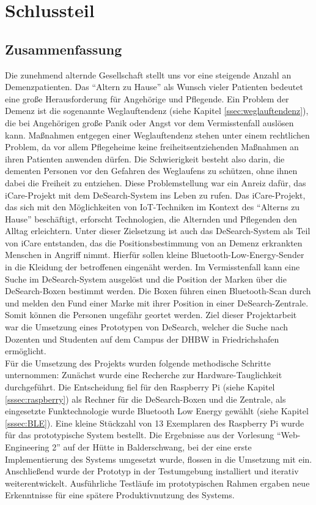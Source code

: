 \section{Schlussteil}
\subsection{Zusammenfassung}
Die zunehmend alternde Gesellschaft stellt uns vor eine steigende Anzahl an Demenzpatienten. Das \enquote{Altern zu Hause} als Wunsch vieler Patienten bedeutet eine große Herausforderung für Angehörige und Pflegende. Ein Problem der Demenz ist die sogenannte Weglauftendenz (siehe Kapitel \ref{ssec:weglauftendenz}), die bei Angehörigen große Panik oder Angst vor dem Vermisstenfall auslösen kann. Maßnahmen entgegen einer Weglauftendenz stehen unter einem rechtlichen Problem, da vor allem Pflegeheime keine freiheitsentziehenden Maßnahmen an ihren Patienten anwenden dürfen. Die Schwierigkeit besteht also darin, die dementen Personen vor den Gefahren des Weglaufens zu schützen, ohne ihnen dabei die Freiheit zu entziehen. Diese Problemstellung war ein Anreiz dafür, das iCare-Projekt mit dem DeSearch-System ins Leben zu rufen. Das iCare-Projekt, das sich mit den Möglichkeiten von IoT-Techniken im Kontext des \enquote{Alterns zu Hause} beschäftigt, erforscht Technologien, die Alternden und Pflegenden den Alltag erleichtern. Unter dieser Zielsetzung ist auch das DeSearch-System als Teil von iCare entstanden, das die Positionsbestimmung von an Demenz erkrankten Menschen in Angriff nimmt.  Hierfür sollen kleine Bluetooth-Low-Energy-Sender in die Kleidung der betroffenen eingenäht werden. Im Vermisstenfall kann eine Suche im DeSearch-System ausgelöst und die Position der Marken über die DeSearch-Boxen bestimmt werden. Die Boxen führen einen Bluetooth-Scan durch und melden den Fund einer Marke mit ihrer Position in einer DeSearch-Zentrale. Somit können die Personen ungefähr geortet werden. Ziel dieser Projektarbeit war die Umsetzung eines Prototypen von DeSearch, welcher die Suche nach Dozenten und Studenten auf dem Campus der DHBW in Friedrichshafen ermöglicht.\\
Für die Umsetzung des Projekts wurden folgende methodische Schritte unternommen: Zunächst wurde eine Recherche zur Hardware-Tauglichkeit durchgeführt. Die Entscheidung fiel für den Raspberry Pi (siehe Kapitel \ref{sssec:raspberry}) als Rechner für die DeSearch-Boxen und die Zentrale, als eingesetzte Funktechnologie wurde Bluetooth Low Energy gewählt (siehe Kapitel \ref{sssec:BLE}). Eine kleine Stückzahl von 13 Exemplaren des Raspberry Pi wurde für das prototypische System bestellt. Die Ergebnisse aus der Vorlesung \enquote{Web-Engineering 2} auf der Hütte in Balderschwang, bei der eine erste Implementierung des Systems umgesetzt wurde, flossen in die Umsetzung mit ein. Anschließend wurde der Prototyp in der Testumgebung installiert und iterativ weiterentwickelt. Ausführliche Testläufe im prototypischen Rahmen ergaben neue Erkenntnisse für eine spätere Produktivnutzung des Systems.\\
